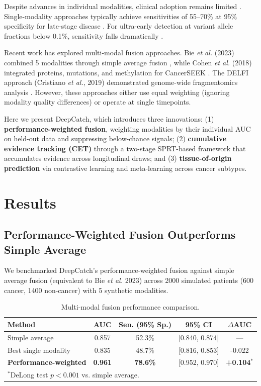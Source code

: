 \documentclass[11pt,a4paper]{article}
\begin{document}
Despite advances in individual modalities, clinical adoption remains limited \citep{cescon2020liquid}. Single-modality approaches typically achieve sensitivities of 55–70\% at 95\% specificity for late-stage disease \citep{phallen2017direct}. For ultra-early detection at variant allele fractions below 0.1\%, sensitivity falls dramatically \citep{newman2014digital}.

Recent work has explored multi-modal fusion approaches. Bie \textit{et al.} (2023) combined 5 modalities through simple average fusion \citep{bie2023multimodal}, while Cohen \textit{et al.} (2018) integrated proteins, mutations, and methylation for CancerSEEK \citep{cohen2018detection}. The DELFI approach (Cristiano \textit{et al.}, 2019) demonstrated genome-wide fragmentomics analysis \citep{cristiano2019genome}. However, these approaches either use equal weighting (ignoring modality quality differences) or operate at single timepoints.

Here we present DeepCatch, which introduces three innovations: (1) \textbf{performance-weighted fusion}, weighting modalities by their individual AUC on held-out data and suppressing below-chance signals; (2) \textbf{cumulative evidence tracking (CET)} through a two-stage SPRT-based framework that accumulates evidence across longitudinal draws; and (3) \textbf{tissue-of-origin prediction} via contrastive learning and meta-learning across cancer subtypes.

\section{Results}

\subsection{Performance-Weighted Fusion Outperforms Simple Average}

We benchmarked DeepCatch's performance-weighted fusion against simple average fusion (equivalent to Bie \textit{et al.} 2023) across 2000 simulated patients (600 cancer, 1400 non-cancer) with 5 synthetic modalities.

\begin{table}[h]
\centering
\caption{Multi-modal fusion performance comparison.}
\label{tab:fusion}
\begin{tabular}{lcccc}
\toprule
\textbf{Method} & \textbf{AUC} & \textbf{Sen. (95\% Sp.)} & \textbf{95\% CI} & $\Delta$AUC \\
\midrule
Simple average & 0.857 & 52.3\% & [0.840, 0.874] & — \\
Best single modality & 0.835 & 48.7\% & [0.816, 0.853] & -0.022 \\
\textbf{Performance-weighted} & \textbf{0.961} & \textbf{78.6\%} & [0.952, 0.970] & \textbf{+0.104}$^{\ast}$ \\
\bottomrule
\multicolumn{5}{l}{\small $^{\ast}$DeLong test $p < 0.001$ vs. simple average.} \\
\end{tabular}
\end{table}
\end{document}
